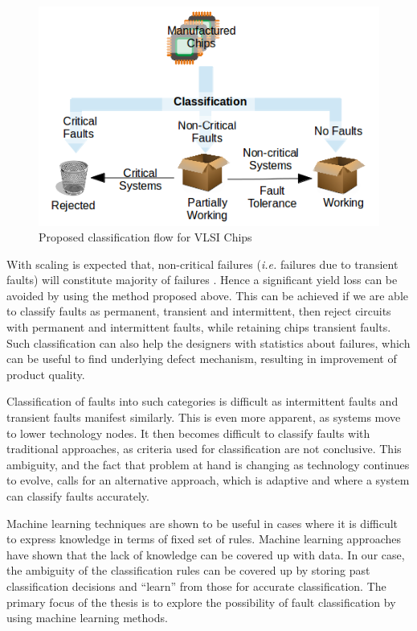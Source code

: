 \begin{figure}[h]
  \begin{center}
    \captionsetup{justification=centering}
    \includegraphics[scale=0.55]{figures/proposedflow.png}
    \caption{Proposed classification flow for VLSI Chips}
    \label{fig:proposedflow}
  \end{center}
\end{figure}

With scaling is expected that, non-critical failures (\emph{i.e.} failures due to transient faults) will constitute majority of failures \cite{Constantinescu2003}. Hence a significant yield loss can be avoided by using the method proposed above. This can be achieved if we are able to classify faults as permanent, transient and intermittent, then reject circuits with permanent and intermittent faults, while retaining chips transient faults. Such classification can also help the designers with statistics about failures, which can be useful to find underlying defect mechanism, resulting in improvement of product quality.

Classification of faults into such categories is difficult as intermittent faults and transient faults manifest similarly. This is even more apparent, as systems move to lower technology nodes. It then becomes difficult to classify faults with traditional approaches, as criteria used for classification are not conclusive. This ambiguity, and the fact that problem at hand is changing as technology continues to evolve, calls for an alternative approach, which is adaptive and where a system can classify faults accurately.

Machine learning techniques are shown to be useful in cases where it is difficult to express knowledge in terms of fixed set of rules. Machine learning approaches have shown that the lack of knowledge can be covered up with data. In our case, the ambiguity of the classification rules can be covered up by storing past classification decisions and \enquote{learn} from those for accurate classification. The primary focus of the thesis is to explore the possibility of fault classification by using machine learning methods.

